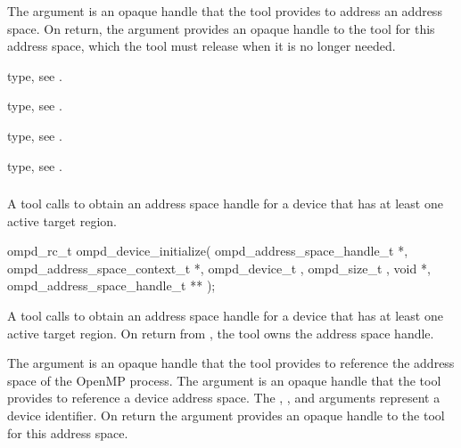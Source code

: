 \argdesc
The  argument is an opaque handle that the tool provides to 
address an address space. On return, the  argument provides 
an opaque handle to the tool for this address space, which the tool must
release when it is no longer needed.

\begin{crossrefs}
\item {} type, 
see .

\item {} type, 
see .

\item {} type, see .

\item {} type, 
see .
\end{crossrefs}



\subsubsection{}
\label{subsubsubsec:ompd_device_initialize}

\summary
A tool calls  to obtain an address space 
handle for a device that has at least one  active target region.

\format
\begin{cspecific}
\begin{ompSyntax}
ompd_rc_t ompd_device_initialize(
  ompd_address_space_handle_t *,
  ompd_address_space_context_t *,
  ompd_device_t ,
  ompd_size_t ,
  void *,
  ompd_address_space_handle_t **
);
\end{ompSyntax}
\end{cspecific}

\descr
A tool calls  to obtain an address space 
handle for a device that has at least one  active target region. On return 
from , the tool owns the address space handle.

\argdesc
The  argument is an opaque handle that the tool provides
to reference the address space of the OpenMP process. The  
argument is an opaque handle that the tool provides to reference a device 
address space. The , , and  arguments represent 
a device identifier. On return the  argument provides an 
opaque handle to the tool for this address space.

